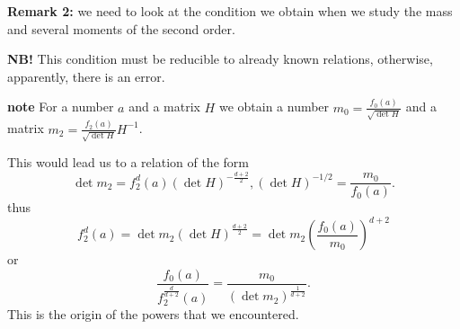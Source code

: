 \textbf{Remark 2:} we need to look at the condition we obtain when we study the mass and several moments of the second order.

\textbf{NB!} This condition must be reducible to already known relations, otherwise, apparently, there is an error.

\textbf{note}
For a number $a$ and a matrix $H$ we obtain a number $m_0=\frac{f_0(a)}{\sqrt{\det H}}$ and a matrix $m_2 = \frac{f_2(a)}{\sqrt{\det H}}H^{-1}$.

This would lead us to a relation of the form
\[
        \det m_2  = f_2^{d}(a)(\det H)^{-\frac{d+2}{2}}, (\det H)^{-1/2} = \frac{m_0}{f_0(a)}.
\]
thus
\[
        f_2^{d}(a) = \det m_2 (\det H)^{\frac{d+2}{2}} = \det m_2 \left( \frac{f_0(a)}{m_0} \right)^{d+2}
\]
or
\[
        \frac{f_0(a)}{f_2^{\frac{d}{d+2}}(a)} = \frac{m_0}{(\det m_2)^{\frac{1}{d+2}}}.
\]
This is the origin %
of the powers that we encountered. 
